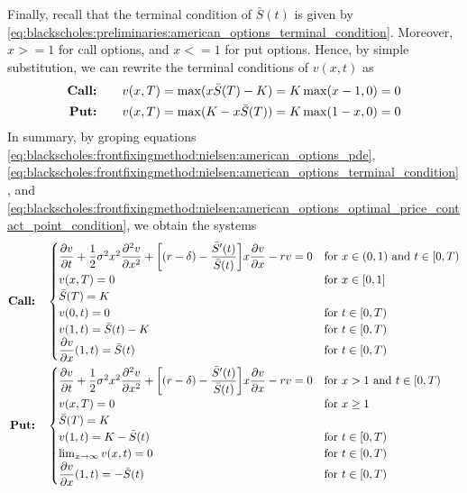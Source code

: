 Finally, recall that the terminal condition of $\bar{S}(t)$ is given by \eqref{eq:blackscholes:preliminaries:american_options_terminal_condition}. Moreover,
$x>=1$ for call options, and $x<=1$ for put options. Hence, by simple substitution, we can rewrite the terminal conditions of $v(x, t)$ as
\begin{subequations} \label{eq:blackscholes:frontfixingmethod:nielsen:american_options_terminal_condition}
  \begin{align}
    \text{\textbf{Call:}} \qquad & v(x, T) = \max(x\bar{S}(T) - K) = K \max(x - 1, 0) = 0 \\
    \text{\textbf{Put:}} \qquad & v(x, T) = \max(K - x\bar{S}(T)) = K \max(1 - x, 0) = 0
  \end{align}
\end{subequations}
In summary, by groping equations
\eqref{eq:blackscholes:frontfixingmethod:nielsen:american_options_pde},
\eqref{eq:blackscholes:frontfixingmethod:nielsen:american_options_terminal_condition}, and
\eqref{eq:blackscholes:frontfixingmethod:nielsen:american_options_optimal_price_contact_point_condition},
we obtain the systems
{
\allowdisplaybreaks  
\begin{subequations} \label{eq:blackscholes:frontfixingmethod:nielsen:american_options_bs_pde}
  \begin{align}
    \text{\textbf{Call:}} \quad &
    \begin{cases}
      \dfrac{\partial{v}}{\partial{t}} + \dfrac{1}{2}\sigma^{2} x^2 \dfrac{\partial^2{v}}{\partial{x}^2} + \bigg[(r - \delta) -
      \dfrac{\bar{S}^\prime(t)}{\bar{S}(t)}\bigg]x\dfrac{\partial{v}}{\partial{x}} - rv = 0 & \text{for $x \in (0, 1)$ and $t \in [0, T)$} \\ 
      v(x, T) = 0 & \text{for $x\in[0, 1]$}  \\
      \bar{S}(T) = K \\ 
      v(0, t) = 0 & \text{for $t\in[0, T)$}\\ 
      v(1, t) = \bar{S}(t) - K & \text{for $t\in[0, T)$}\\ 
      \dfrac{\partial{v}}{\partial{x}}(1, t) = \bar{S}(t) & \text{for $t\in[0, T)$}
    \end{cases}\\
    \text{\textbf{Put:}} \quad &
    \begin{cases}
      \dfrac{\partial{v}}{\partial{t}} + \dfrac{1}{2}\sigma^{2} x^2 \dfrac{\partial^2{v}}{\partial{x}^2} + \bigg[(r - \delta) -
      \dfrac{\bar{S}^\prime(t)}{\bar{S}(t)}\bigg]x\dfrac{\partial{v}}{\partial{x}} - rv = 0 & \text{for $x > 1$ and $t \in [0, T)$} \\ 
      v(x, T) = 0 & \text{for $x \ge 1$} \\
      \bar{S}(T) = K \\ 
      v(1, t) = K - \bar{S}(t) & \text{for $t\in[0, T)$} \\
      \lim_{x\rightarrow\infty}v(x, t) = 0 & \text{for $t\in[0, T)$} \\
      \dfrac{\partial{v}}{\partial{x}}(1, t) = -\bar{S}(t) & \text{for $t\in[0, T)$}
    \end{cases}
  \end{align}
\end{subequations}
}
